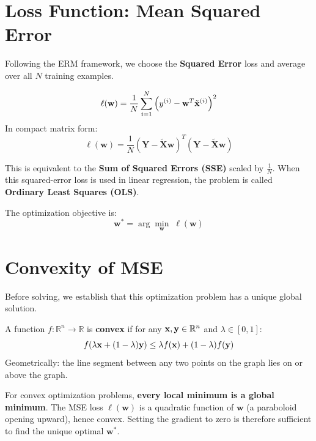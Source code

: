\section*{Loss Function: Mean Squared Error}

Following the ERM framework, we choose the \textbf{Squared Error} loss and average over all $N$ training examples.

\begin{definition}
$$\ell(\mathbf{w}) = \frac{1}{N} \sum_{i=1}^{N} \left( y^{(i)} - \mathbf{w}^T \tilde{\mathbf{x}}^{(i)} \right)^2$$
In compact matrix form:
$$\ell(\mathbf{w}) = \frac{1}{N} \left( \mathbf{Y} - \tilde{\mathbf{X}} \mathbf{w} \right)^T \left( \mathbf{Y} - \tilde{\mathbf{X}} \mathbf{w} \right)$$
\end{definition}

This is equivalent to the \textbf{Sum of Squared Errors (SSE)} scaled by $\frac{1}{N}$. When this squared-error loss is used in linear regression, the problem is called \textbf{Ordinary Least Squares (OLS)}.

The optimization objective is:
$$\mathbf{w}^* = \arg\min_{\mathbf{w}} \; \ell(\mathbf{w})$$

\section*{Convexity of MSE}

Before solving, we establish that this optimization problem has a unique global solution.

\begin{definition}
A function $f: \mathbb{R}^n \to \mathbb{R}$ is \textbf{convex} if for any $\mathbf{x}, \mathbf{y} \in \mathbb{R}^n$ and $\lambda \in [0, 1]$:
$$f\!\left(\lambda \mathbf{x} + (1-\lambda)\mathbf{y}\right) \leq \lambda f(\mathbf{x}) + (1-\lambda) f(\mathbf{y})$$
Geometrically: the line segment between any two points on the graph lies on or above the graph.
\end{definition}

\begin{remark}
For convex optimization problems, \textbf{every local minimum is a global minimum}. The MSE loss $\ell(\mathbf{w})$ is a quadratic function of $\mathbf{w}$ (a paraboloid opening upward), hence convex. Setting the gradient to zero is therefore sufficient to find the unique optimal $\mathbf{w}^*$.
\end{remark}

